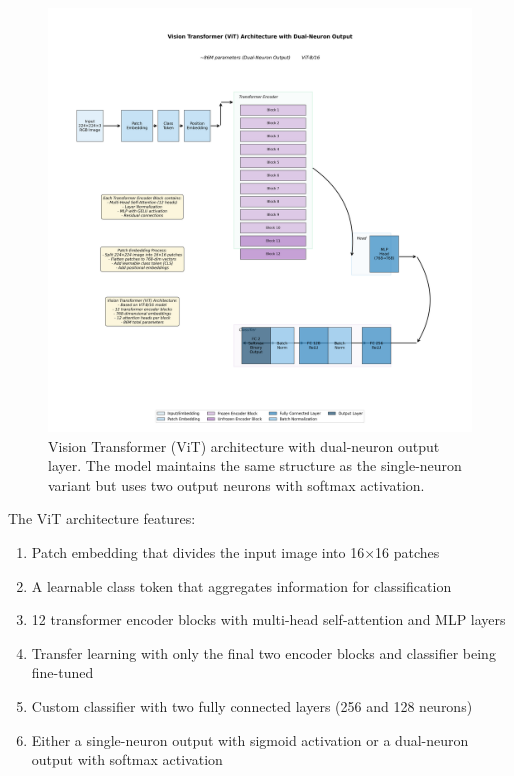 \begin{figure}[htbp]
\centering
\includegraphics[width=\textwidth]{figures/vit_2neuron_architecture.png}
\caption{Vision Transformer (ViT) architecture with dual-neuron output layer. The model maintains the same structure as the single-neuron variant but uses two output neurons with softmax activation.}
\label{fig:vit_arch_dual}
\end{figure}

The ViT architecture features:
\begin{enumerate}
\item Patch embedding that divides the input image into 16×16 patches
\item A learnable class token that aggregates information for classification
\item 12 transformer encoder blocks with multi-head self-attention and MLP layers
\item Transfer learning with only the final two encoder blocks and classifier being fine-tuned
\item Custom classifier with two fully connected layers (256 and 128 neurons)
\item Either a single-neuron output with sigmoid activation or a dual-neuron output with softmax activation
\end{enumerate}

